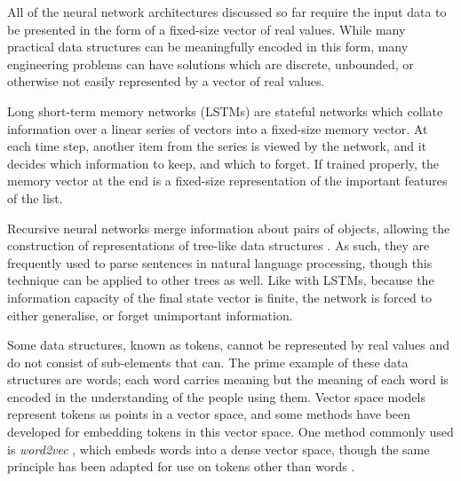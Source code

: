 \documentclass[../../main.tex]{subfiles}
\begin{document}
All of the neural network architectures discussed so far require the input data to be presented in the form of a fixed-size vector of real values.
While many practical data structures can be meaningfully encoded in this form, many engineering problems can have solutions which are discrete, unbounded, or otherwise not easily represented by a vector of real values.

Long short-term memory networks (LSTMs) \cite{hochreiter97} are stateful networks which collate information over a linear series of vectors into a fixed-size memory vector.
At each time step, another item from the series is viewed by the network, and it decides which information to keep, and which to forget.
If trained properly, the memory vector at the end is a fixed-size representation of the important features of the list.

Recursive neural networks merge information about pairs of objects, allowing the construction of representations of tree-like data structures \cite{socher11}.
As such, they are frequently used to parse sentences in natural language processing, though this technique can be applied to other trees as well.
Like with LSTMs, because the information capacity of the final state vector is finite, the network is forced to either generalise, or forget unimportant information.

Some data structures, known as tokens, cannot be represented by real values and do not consist of sub-elements that can.
The prime example of these data structures are words; each word carries meaning but the meaning of each word is encoded in the understanding of the people using them.
Vector space models represent tokens as points in a vector space, and some methods have been developed for embedding tokens in this vector space.
One method commonly used is \emph{word2vec} \cite{mikolov13}, which embeds words into a dense vector space, though the same principle
has been adapted for use on tokens other than words \cite{le14}.
\end{document}
